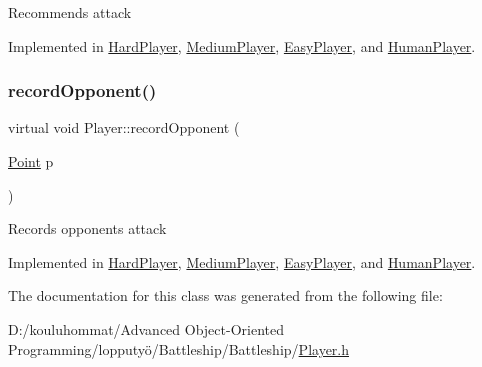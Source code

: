 Recommends attack 

Implemented in \mbox{\hyperlink{class_hard_player_ae1d21325a648a88f1bf51f2b0b286190}{Hard\+Player}}, \mbox{\hyperlink{class_medium_player_a2e99d57f30f3f7f929840b8cda16527d}{Medium\+Player}}, \mbox{\hyperlink{class_easy_player_a9b00f4a9acc74ff688c609bc15bdbb4d}{Easy\+Player}}, and \mbox{\hyperlink{class_human_player_a718f16f3ddeeb34c9f2e93cf1d805b46}{Human\+Player}}.

\mbox{\label{class_player_a768e14edee61e208e6fd295cdd72a49c}} 
\subsubsection{\texorpdfstring{record\+Opponent()}{recordOpponent()}}
{\footnotesize\ttfamily virtual void Player\+::record\+Opponent (\begin{DoxyParamCaption}\item[{\mbox{\hyperlink{class_point}{Point}}}]{p }\end{DoxyParamCaption})\hspace{0.3cm}{\ttfamily [pure virtual]}}

Records opponent\textquotesingle{}s attack 

Implemented in \mbox{\hyperlink{class_hard_player_a986175fb966099ac5fe39950e18799ae}{Hard\+Player}}, \mbox{\hyperlink{class_medium_player_a6183d4a8fe3d68419afcfa9e33cd5928}{Medium\+Player}}, \mbox{\hyperlink{class_easy_player_a2121149ace67b4a67a5dfa7633738ea3}{Easy\+Player}}, and \mbox{\hyperlink{class_human_player_a16b18f42e02d7c8d1f0971ce5e91595f}{Human\+Player}}.



The documentation for this class was generated from the following file\+:\begin{DoxyCompactItemize}
\item 
D\+:/kouluhommat/\+Advanced Object-\/\+Oriented Programming/lopputyö/\+Battleship/\+Battleship/\mbox{\hyperlink{_player_8h}{Player.\+h}}\end{DoxyCompactItemize}
